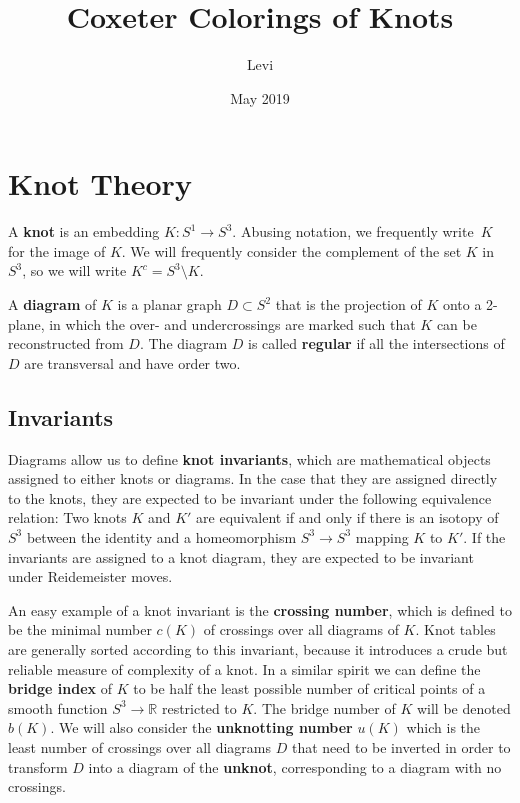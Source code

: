 \documentclass{article}
\title{Coxeter Colorings of Knots}
\author{Levi}
\date{May 2019}
\theoremstyle{definition}
\begin{document}
\maketitle
\tableofcontents

\section{Knot Theory}

A \textbf{knot} is an embedding $K: S^1 \rightarrow S^3$. Abusing notation, we frequently write~$K$ for the image of $K$. We will frequently consider the complement of the set $K$ in $S^3$, so we will write $K^c = S^3 \setminus K$.

A \textbf{diagram} of $K$ is a planar graph $D \subset S^2$ that is the projection of $K$ onto a 2-plane, in which the over- and undercrossings are marked such that $K$ can be reconstructed from $D$. The diagram $D$ is called \textbf{regular} if all the intersections of $D$ are transversal and have order two. 

\subsection{Invariants}
Diagrams allow us to define \textbf{knot invariants}, which are mathematical objects assigned to either knots or diagrams. In the case that they are assigned directly to the knots, they are expected to be invariant under the following equivalence relation: Two knots $K$ and $K'$ are equivalent if and only if there is an isotopy of $S^3$ between the identity and a homeomorphism $S^3 \rightarrow S^3$ mapping $K$ to $K'$. If the invariants are assigned to a knot diagram, they are expected to be invariant under Reidemeister moves. 

An easy example of a knot invariant is the \textbf{crossing number}, which is defined to be the minimal number $c(K)$ of crossings over all diagrams of $K$. Knot tables are generally sorted according to this invariant, because it introduces a crude but reliable measure of complexity of a knot. In a similar spirit we can define the \textbf{bridge index} of $K$ to be half the least possible number of critical points of a smooth function $S^3 \rightarrow \mathbb{R}$ restricted to $K$. The bridge number of $K$ will be denoted $b(K)$. We will also consider the \textbf{unknotting number} $u(K)$ which is the least number of crossings over all diagrams $D$ that need to be inverted in order to transform $D$ into a diagram of the \textbf{unknot}, corresponding to a diagram with no crossings.
\end{document}
